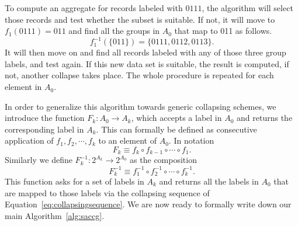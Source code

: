 \documentclass[11pt, fleqn]{article}
\begin{document}
To compute an aggregate for records labeled with $0111$, the algorithm will
select those records and test whether the subset is suitable. If not, it will
move to $f_1(0111)=011$ and find all the groups in $A_0$ that map to 011 as
follows.
\begin{displaymath}
f_1^{-1}(\{011\}) = \{0111, 0112, 0113\}.
\end{displaymath}
It will then move on and find all records labeled with any of those three
group labels, and test again. If this new data set is suitable, the result is
computed, if not, another collapse takes place. The whole procedure is repeated 
for each element in $A_0$.




In order to generalize this algorithm towards generic collapsing schemes, we
introduce the function $F_k:A_0\to A_k$, which accepts a label in $A_0$ and
returns the corresponding label in $A_k$. This can formally be defined as
consecutive application of $f_1, f_2,\cdots, f_k$ to an element of $A_0$. In
notation
\begin{equation*}
F_k \equiv f_k\circ f_{k-1}\circ\cdots\circ f_1.
\end{equation*}
Similarly we define $F^{-1}_k:2^{A_k}\to 2^{A_0}$ as the composition
\begin{equation*}
F_k^{-1} \equiv f_1^{-1}\circ f_2^{-1}\circ\cdots\circ f_k^{-1}.
\end{equation*}
This function asks for a set of labels in $A_k$ and returns all the labels in
$A_0$ that are mapped to those labels via the collapsing sequence of
Equation~\eqref{eq:collapsingsequence}.  We are now ready to formally write
down our main Algorithm~\ref{alg:saccg}.
\end{document}
